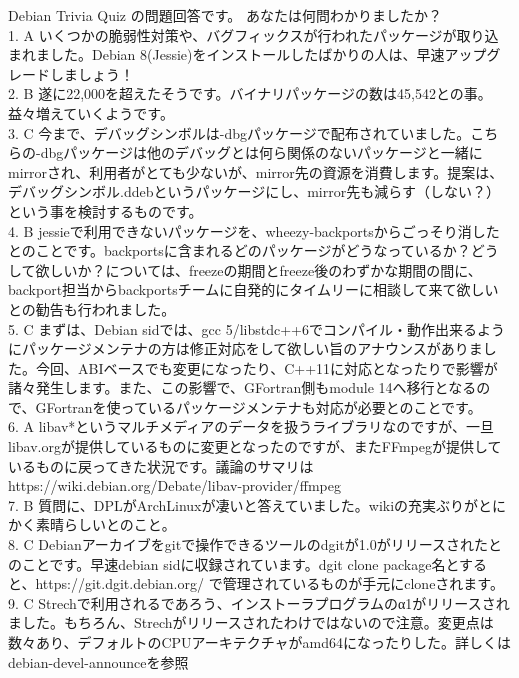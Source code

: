 \documentclass[mingoth,a4paper]{jsarticle}
\begin{document}
 Debian Trivia Quiz の問題回答です。
 あなたは何問わかりましたか？ \\
1. A いくつかの脆弱性対策や、バグフィックスが行われたパッケージが取り込まれました。Debian 8(Jessie)をインストールしたばかりの人は、早速アップグレードしましょう！\\
2. B 遂に22,000を超えたそうです。バイナリパッケージの数は45,542との事。益々増えていくようです。\\
3. C 今まで、デバッグシンボルは-dbgパッケージで配布されていました。こちらの-dbgパッケージは他のデバッグとは何ら関係のないパッケージと一緒にmirrorされ、利用者がとても少ないが、mirror先の資源を消費します。提案は、デバッグシンボル.ddebというパッケージにし、mirror先も減らす（しない？）という事を検討するものです。\\
4. B jessieで利用できないパッケージを、wheezy-backportsからごっそり消したとのことです。backportsに含まれるどのパッケージがどうなっているか？どうして欲しいか？については、freezeの期間とfreeze後のわずかな期間の間に、backport担当からbackportsチームに自発的にタイムリーに相談して来て欲しいとの勧告も行われました。\\
5. C まずは、Debian sidでは、gcc 5/libstdc++6でコンパイル・動作出来るようにパッケージメンテナの方は修正対応をして欲しい旨のアナウンスがありました。今回、ABIベースでも変更になったり、C++11に対応となったりで影響が諸々発生します。また、この影響で、GFortran側もmodule 14へ移行となるので、GFortranを使っているパッケージメンテナも対応が必要とのことです。\\
6. A libav*というマルチメディアのデータを扱うライブラリなのですが、一旦libav.orgが提供しているものに変更となったのですが、またFFmpegが提供しているものに戻ってきた状況です。議論のサマリは https://wiki.debian.org/Debate/libav-provider/ffmpeg\\
7. B 質問に、DPLがArchLinuxが凄いと答えていました。wikiの充実ぶりがとにかく素晴らしいとのこと。\\
8. C Debianアーカイブをgitで操作できるツールのdgitが1.0がリリースされたとのことです。早速debian sidに収録されています。dgit clone package名とすると、https://git.dgit.debian.org/ で管理されているものが手元にcloneされます。\\
9. C Strechで利用されるであろう、インストーラプログラムのα1がリリースされました。もちろん、Strechがリリースされたわけではないので注意。変更点は数々あり、デフォルトのCPUアーキテクチャがamd64になったりした。詳しくはdebian-devel-announceを参照\\
\end{document}
